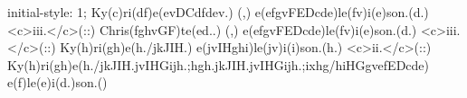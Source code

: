 initial-style: 1;
Ky(c)ri(df)e(evDCdfdev.) (,) e(efgvFEDcde)le(fv)i(e)son.(d.) <c>iii.</c>(::) Chris(fghvGF)te(ed..) (,) e(efgvFEDcde)le(fv)i(e)son.(d.) <c>iii.</c>(::) Ky(h)ri(gh)e(h./jkJIH.) e(jvIHghi)le(jv)i(i)son.(h.) <c>ii.</c>(::) Ky(h)ri(gh)e(h./jkJIH.jvIHGijh.;hgh.jkJIH.jvIHGijh.;ixhg/hiHGgvefEDcde) e(f)le(e)i(d.)son.()
